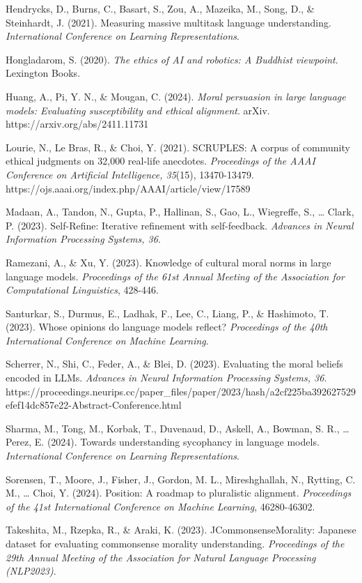 \documentclass[
  11pt,
]{article}
\begin{document}
Hendrycks, D., Burns, C., Basart, S., Zou, A., Mazeika, M., Song, D., \&
Steinhardt, J. (2021). Measuring massive multitask language
understanding. \emph{International Conference on Learning
Representations}.

Hongladarom, S. (2020). \emph{The ethics of AI and robotics: A Buddhist
viewpoint}. Lexington Books.

Huang, A., Pi, Y. N., \& Mougan, C. (2024). \emph{Moral persuasion in
large language models: Evaluating susceptibility and ethical alignment}.
arXiv. https://arxiv.org/abs/2411.11731

Lourie, N., Le Bras, R., \& Choi, Y. (2021). SCRUPLES: A corpus of
community ethical judgments on 32,000 real-life anecdotes.
\emph{Proceedings of the AAAI Conference on Artificial Intelligence,
35}(15), 13470-13479.
https://ojs.aaai.org/index.php/AAAI/article/view/17589

Madaan, A., Tandon, N., Gupta, P., Hallinan, S., Gao, L., Wiegreffe, S.,
\ldots{} Clark, P. (2023). Self-Refine: Iterative refinement with
self-feedback. \emph{Advances in Neural Information Processing Systems,
36}.

Ramezani, A., \& Xu, Y. (2023). Knowledge of cultural moral norms in
large language models. \emph{Proceedings of the 61st Annual Meeting of
the Association for Computational Linguistics}, 428-446.

Santurkar, S., Durmus, E., Ladhak, F., Lee, C., Liang, P., \& Hashimoto,
T. (2023). Whose opinions do language models reflect? \emph{Proceedings
of the 40th International Conference on Machine Learning}.

Scherrer, N., Shi, C., Feder, A., \& Blei, D. (2023). Evaluating the
moral beliefs encoded in LLMs. \emph{Advances in Neural Information
Processing Systems, 36}.
https://proceedings.neurips.cc/paper\_files/paper/2023/hash/a2cf225ba392627529efef14dc857e22-Abstract-Conference.html

Sharma, M., Tong, M., Korbak, T., Duvenaud, D., Askell, A., Bowman, S.
R., \ldots{} Perez, E. (2024). Towards understanding sycophancy in
language models. \emph{International Conference on Learning
Representations}.

Sorensen, T., Moore, J., Fisher, J., Gordon, M. L., Mireshghallah, N.,
Rytting, C. M., \ldots{} Choi, Y. (2024). Position: A roadmap to
pluralistic alignment. \emph{Proceedings of the 41st International
Conference on Machine Learning}, 46280-46302.

Takeshita, M., Rzepka, R., \& Araki, K. (2023). JCommonsenseMorality:
Japanese dataset for evaluating commonsense morality understanding.
\emph{Proceedings of the 29th Annual Meeting of the Association for
Natural Language Processing (NLP2023)}.
\end{document}
